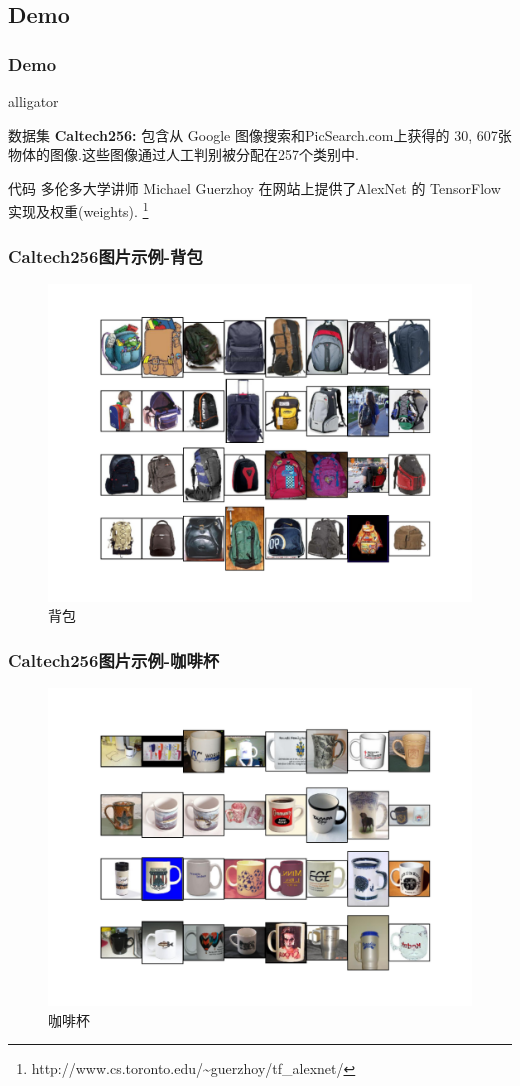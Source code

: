 \documentclass[table]{beamer}
\begin{document}
\subsection{Demo}
\begin{frame}
	\frametitle{Demo}
	\begin{labeling}{alligator}
		\item [数据集] \textbf{Caltech256:} 包含从 Google 图像搜索和PicSearch.com上获得的 30, 607张物体的图像.这些图像通过人工判别被分配在257个类别中.
		\item [代码] 多伦多大学讲师 Michael Guerzhoy 在网站上提供了AlexNet 的 TensorFlow 实现及权重(weights). \footnote{\label{ft:alexnet}http://www.cs.toronto.edu/\textasciitilde{}guerzhoy/tf\_alexnet/}
	\end{labeling}
\end{frame}
\begin{frame}
	\frametitle{Caltech256图片示例-背包}
	\begin{figure}
		\centering
		\includegraphics[width=0.7\linewidth]{backpack.pdf}
		\caption{背包}
	\end{figure}
\end{frame}
\begin{frame}
	\frametitle{Caltech256图片示例-咖啡杯}
	\begin{figure}
		\centering
		\includegraphics[width=0.7\linewidth]{coffee-mug.pdf}
		\caption{咖啡杯}
	\end{figure}
\end{frame}
\end{document}
